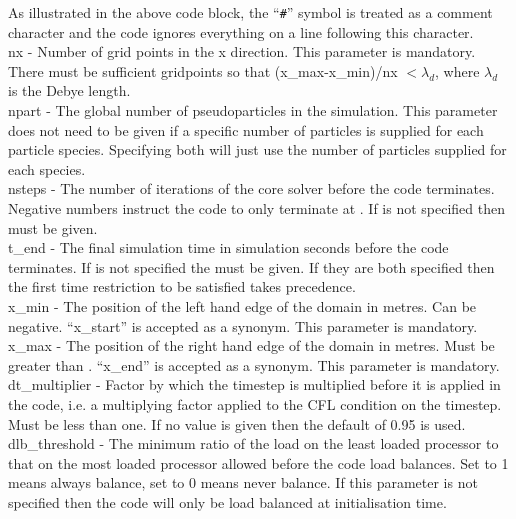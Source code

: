 As illustrated in the above code block, the ``{\texttt{\#}}'' symbol is treated
as a comment character and the code ignores everything on a line following this
character.\\

{\emphtext nx} - Number of grid points in the x direction. This parameter
is mandatory. There must be sufficient gridpoints so that
(x\_max-x\_min)/nx $< \lambda_d$, where $\lambda_d$ is the Debye length.\\

{\emphtext npart} - The global number of pseudoparticles in the
simulation. This parameter does not need to be given if a specific number
of particles is supplied for each particle species. Specifying both will just
use the number of particles supplied for each species.\\

{\emphtext nsteps} - The number of iterations of the core solver before the
code terminates. Negative numbers instruct the code to only terminate at
. If  is not specified then
 must be given.\\

{\emphtext t\_end} - The final simulation time in simulation seconds before the
code terminates. If  is not specified the
 must be given. If they are both specified then
the first time restriction to be satisfied takes precedence.\\

{\emphtext x\_min} - The position of the left hand edge of the domain in
metres. Can be negative. ``x\_start'' is accepted as a synonym. This parameter
is mandatory.\\

{\emphtext x\_max} - The position of the right hand edge of the domain in
metres. Must be greater than .
``x\_end'' is accepted as a synonym. This parameter is mandatory.\\

{\emphtext dt\_multiplier} - Factor by which the timestep is multiplied before
it is applied in the code, i.e. a multiplying factor applied to the CFL
condition on the timestep. Must be less than one. If no value is given then
the default of 0.95 is used.\\

{\emphtext dlb\_threshold} - The minimum ratio of the
load on the least loaded processor to that on the most loaded processor allowed
before the code load balances. Set to 1 means
always balance, set to 0 means never balance. If this parameter is not
specified then the code will only be load balanced at initialisation time.\\

